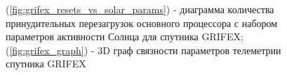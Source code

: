 \documentclass[12pt, a4paper]{extreport}
\begin{document}
\begin{figure}[htbp]
    \centering
    \hfill %
    \caption{(\ref{fig:grifex_resets_vs_solar_params}) - диаграмма количества принудительных перезагрузок основного процессора с набором параметров активности Солнца для спутника GRIFEX; (\ref{fig:grifex_graph}) - 3D граф связности параметров телеметрии спутника GRIFEX}
    \label{fig:combined_figure}
\end{figure}
\end{document}
